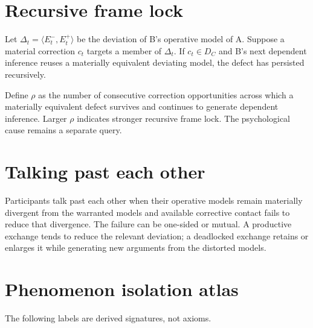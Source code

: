 \documentclass[11pt]{article}
\begin{document}
\section{Recursive frame lock}
Let $\Delta_t=\langle E^-_t,E^+_t\rangle$ be the deviation of B's operative model of A. Suppose a material correction $c_t$ targets a member of $\Delta_t$. If $c_t\in D_C$ and B's next dependent inference reuses a materially equivalent deviating model, the defect has persisted recursively.

Define $\rho$ as the number of consecutive correction opportunities across which a materially equivalent defect survives and continues to generate dependent inference. Larger $\rho$ indicates stronger recursive frame lock. The psychological cause remains a separate query.

\section{Talking past each other}
Participants talk past each other when their operative models remain materially divergent from the warranted models and available corrective contact fails to reduce that divergence. The failure can be one-sided or mutual. A productive exchange tends to reduce the relevant deviation; a deadlocked exchange retains or enlarges it while generating new arguments from the distorted models.

\section{Phenomenon isolation atlas}
The following labels are derived signatures, not axioms.
\end{document}
